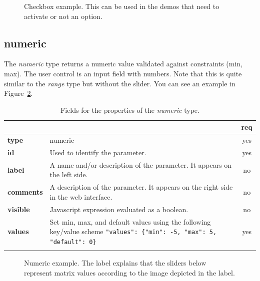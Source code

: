 \begin{figure}[h]
\centering
{}
\caption{Checkbox example. This can be used in the demos that need to activate or not an option.}
\label{fig:checkbox_example}
\end{figure}

\subsection{numeric}

The \emph{numeric} type returns a numeric value validated against constraints (min, max). The user control is an input field with numbers. Note that this is quite similar to the \emph{range} type but without the slider. You can see an example in Figure~\ref{fig:numeric_example}.

\begin{longtable}{|>{\bf}L{\linewidth}|L{\linewidth}|c|}
\hline
      &  & {\bf req} 
\tabularnewline \hline \hline
 type       & numeric   & yes \\ \hline
 id     & Used to identify the parameter. & yes \\ \hline
 label  & A name and/or description of the parameter. It appears on the left side. & no
                      \\ \hline
 comments & A description of the parameter. It appears on the right side in the web interface. & no
                      \\ \hline
 visible    & Javascript expression evaluated as a boolean. & no \\ \hline
 values     & Set min, max, and default values using the following key/value scheme \texttt{"values": \{"min": -5, "max": 5, "default": 0\}} & yes \\ \hline
\caption{Fields for the properties of the \emph{numeric} type.}
\end{longtable}

\begin{figure}[h!]
\centering
{}
\caption{Numeric example. The label explains that the sliders below represent matrix values according to the image depicted in the label.}
\label{fig:numeric_example}
\end{figure}

